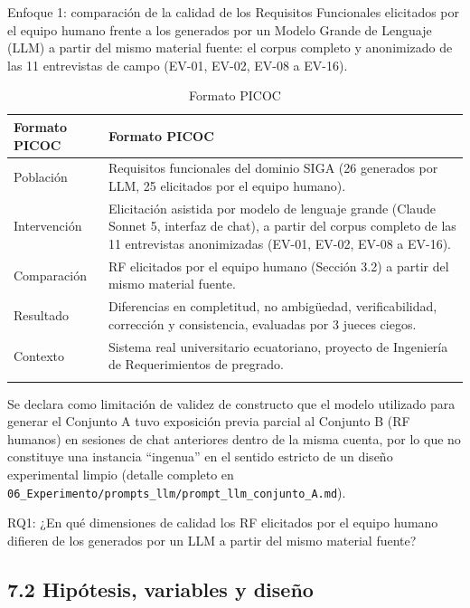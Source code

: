 
Enfoque 1: comparación de la calidad de los Requisitos Funcionales elicitados por el equipo humano frente a los generados por un Modelo Grande de Lenguaje (LLM) a partir del mismo material fuente: el corpus completo y anonimizado de las 11 entrevistas de campo (EV-01, EV-02, EV-08 a EV-16).


\begingroup
\small
\begin{longtable}{|p{7.8cm}|p{7.8cm}|}
\hline
Formato PICOC & Formato PICOC \\ \hline
Población & Requisitos funcionales del dominio SIGA (26 generados por LLM, 25 elicitados por el equipo humano). \\ \hline
Intervención & Elicitación asistida por modelo de lenguaje grande (Claude Sonnet 5, interfaz de chat), a partir del corpus completo de las 11 entrevistas anonimizadas (EV-01, EV-02, EV-08 a EV-16). \\ \hline
Comparación & RF elicitados por el equipo humano (Sección 3.2) a partir del mismo material fuente. \\ \hline
Resultado & Diferencias en completitud, no ambigüedad, verificabilidad, corrección y consistencia, evaluadas por 3 jueces ciegos. \\ \hline
Contexto & Sistema real universitario ecuatoriano, proyecto de Ingeniería de Requerimientos de pregrado. \\ \hline
\caption{Formato PICOC}
\end{longtable}
\endgroup

Se declara como limitación de validez de constructo que el modelo utilizado para generar el Conjunto A tuvo exposición previa parcial al Conjunto B (RF humanos) en sesiones de chat anteriores dentro de la misma cuenta, por lo que no constituye una instancia ``ingenua'' en el sentido estricto de un diseño experimental limpio (detalle completo en \texttt{06\_Experimento/prompts\_llm/prompt\_llm\_conjunto\_A.md}).

RQ1: ¿En qué dimensiones de calidad los RF elicitados por el equipo humano difieren de los generados por un LLM a partir del mismo material fuente?


\subsection*{7.2 Hipótesis, variables y diseño}


